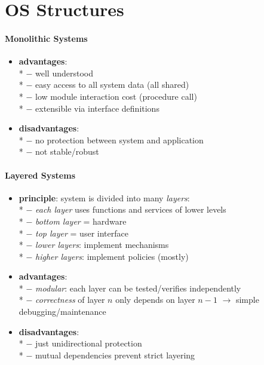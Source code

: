 \section{OS Structures}

\paragraph{Monolithic Systems}
\begin{itemize}
  \item \textbf{advantages}: \\*
    $ - $ well understood \\*
    $ - $ easy access to all system data (all shared) \\*
    $ - $ low module interaction cost (procedure call) \\*
    $ - $ extensible via interface definitions
  \item \textbf{disadvantages}: \\*
    $ - $ no protection between system and application \\*
    $ - $ not stable/robust
\end{itemize}

\paragraph{Layered Systems}
\begin{itemize}
  \item \textbf{principle}: system is divided into many \emph{layers}: \\*
    $ - $ \emph{each layer} uses functions and services of lower levels \\*
    $ - $ \emph{bottom layer} = hardware \\*
    $ - $ \emph{top layer} = user interface \\*
    $ - $ \emph{lower layers}: implement mechanisms \\*
    $ - $ \emph{higher layers}: implement policies (mostly)
  \item \textbf{advantages}: \\*
    $ - $ \emph{modular}: each layer can be tested/verifies independently \\*
    $ - $ \emph{correctness} of layer $ n $ only depends on layer $ n-1 $ $ \to $ simple debugging/maintenance
  \item \textbf{disadvantages}: \\*
    $ - $ just unidirectional protection \\*
    $ - $ mutual dependencies prevent strict layering
\end{itemize}

